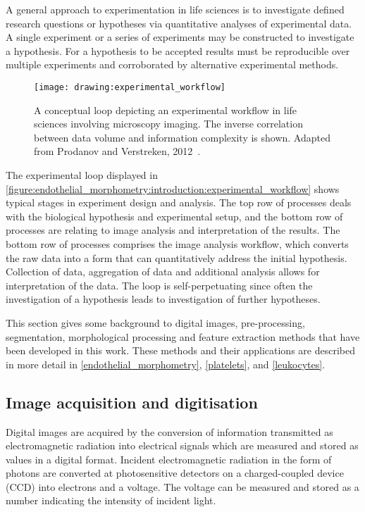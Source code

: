 A general approach to experimentation in life sciences is to investigate defined research questions or hypotheses via quantitative analyses of experimental data. A single experiment or a series of experiments may be constructed to investigate a hypothesis. For a hypothesis to be accepted results must be reproducible over multiple experiments and corroborated by alternative experimental methods.

\begin{figure}[htbp!]
	\centering
	\texttt{[image: drawing:experimental\_workflow]}
	\caption[Experimental workflow in life science imaging]{A conceptual loop depicting an experimental workflow in life sciences involving microscopy imaging. The inverse correlation between data volume and information complexity is shown. Adapted from Prodanov and Verstreken, 2012~\cite{Prodanov2012}.}
	\label{figure:endothelial_morphometry:introduction:experimental_workflow}
\end{figure}

The experimental loop displayed in \autoref{figure:endothelial_morphometry:introduction:experimental_workflow} shows typical stages in experiment design and analysis. The top row of processes deals with the biological hypothesis and experimental setup, and the bottom row of processes are relating to image analysis and interpretation of the results. The bottom row of processes comprises the image analysis workflow, which converts the raw data into a form that can quantitatively address the initial hypothesis. Collection of data, aggregation of data and additional analysis allows for interpretation of the data. The loop is self-perpetuating since often the investigation of a hypothesis leads to investigation of further hypotheses.

This section gives some background to digital images, pre-processing, segmentation, morphological processing and feature extraction methods that have been developed in this work. These methods and their applications are described in more detail in \autoref{endothelial_morphometry}, \autoref{platelets}, and \autoref{leukocytes}.

\subsection{Image acquisition and digitisation}
\label{introduction:image_processing:image_acquisition}
Digital images are acquired by the conversion of information transmitted as electromagnetic radiation into electrical signals which are measured and stored as values in a digital format. Incident electromagnetic radiation in the form of photons are converted at photosensitive detectors on a charged-coupled device (CCD) into electrons and a voltage. The voltage can be measured and stored as a number indicating the intensity of incident light.

